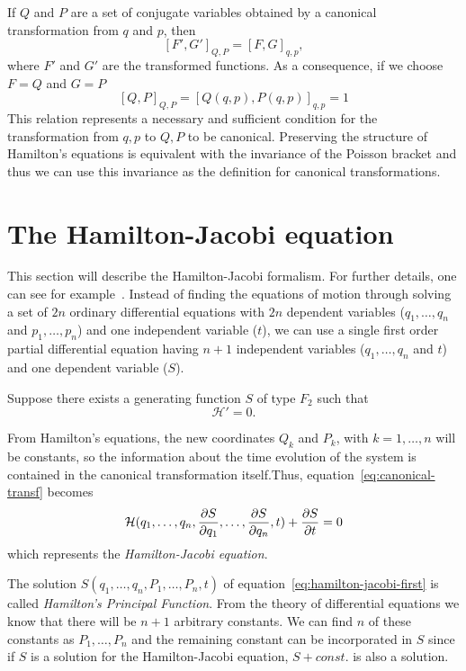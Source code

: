 \documentclass[../thesis.tex]{subfiles}
\theoremstyle{plain}
\begin{document}
If $Q$ and $P$ are a set of conjugate variables obtained by a canonical transformation
from $q$ and $p$, then
\[
  {\left[F', G'\right]}_{Q,P} = {\left[F, G\right]}_{q,p},
\]
where $F'$ and $G'$ are the transformed functions.
As a consequence, if we choose \(F=Q\) and \(G=P\)
\[
  {\left[Q, P\right]}_{Q,P} = {\left[Q(q,p), P(q,p)\right]}_{q,p} = 1
\]
This relation represents a necessary and sufficient condition for the transformation from
$q,p$ to $Q,P$ to be canonical.
Preserving the structure of Hamilton's equations is equivalent with the invariance of the
Poisson bracket and thus we can use this invariance as the definition for canonical
transformations.


\section{The Hamilton-Jacobi equation}

This section will describe the Hamilton-Jacobi formalism. For further details,
one can see for example~\cite{Hand1998, Goldstein2002}.
Instead of finding the equations of motion through solving a set of \(2n\) ordinary differential
equations with \(2n\) dependent variables (\(q_1, \dotsc, q_n\) and \(p_1, \dotsc, p_n\))
and one independent variable (\(t\)), we can use a single first order partial differential equation
having \(n+1\) independent variables (\(q_1, \dotsc, q_n\) and \(t\)) and one
dependent variable (\(S\)).

Suppose there exists a generating function \(S\) of type \(F_2\) such that
\[
  \mathcal{H'} = 0.
\]

From Hamilton's equations, the new coordinates \(Q_k\) and \(P_k\), with \(k=1,\dotsc,n\) will
be constants, so the information about the time evolution of the system is contained
in the canonical transformation itself.Thus, equation~\eqref{eq:canonical-transf} becomes
\begin{equation}
  \label{eq:hamilton-jacobi-first}
  \mathcal{H}(q_1,\dotsc,q_n,\pdv{S}{q_1},\dotsc,\pdv{S}{q_n},t) + \pdv{S}{t} = 0
\end{equation}
which represents the \emph{Hamilton-Jacobi equation}.

The solution \(S(q_1,\dotsc,q_n,P_1,\dotsc,P_n,t)\) of
equation~\eqref{eq:hamilton-jacobi-first} is called \emph{Hamilton's Principal Function}.
From the theory of differential equations we know that there will be \(n+1\) arbitrary constants.
We can find \(n\) of these constants as \(P_1,\dotsc,P_n\) and the remaining constant can be
incorporated in \(S\) since if \(S\) is a solution for the Hamilton-Jacobi equation,
\(S+const.\) is also a solution.
\end{document}
